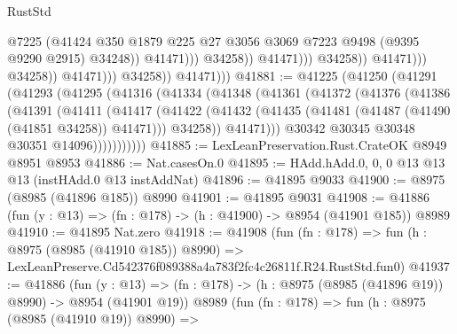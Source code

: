 \begin{lexlean}{RustStd}
\begin{coremodule}
                                                    @7225
                                                    (@41424
                                                      @350
                                                      @1879
                                                      @225
                                                      @27
                                                      @3056
                                                      @3069
                                                      @7223
                                                      @9498
                                                      (@9395 @9290 @2915)
                                                      @34248))
                                                  @41471)))
                                            @34258))
                                        @41471)))
                                  @34258))
                              @41471)))
                        @34258))
                    @41471)))
              @34258))
          @41471)))
@41881 := @41225
    (@41250
      (@41291
        (@41293
          (@41295
            (@41316
              (@41334
                (@41348
                  (@41361
                    (@41372
                      (@41376
                        (@41386
                          (@41391
                            (@41411
                              (@41417
                                (@41422
                                  (@41432
                                    (@41435 (@41481 (@41487 (@41490 (@41851 @34258)) @41471)))
                                    @34258))
                                @41471)))
                          @30342
                          @30345
                          @30348
                          @30351
                          @14096)))))))))))
@41885 := LexLeanPreservation.Rust.CrateOK @8949 @8951 @8953
@41886 := Nat.casesOn.{0}
@41895 := HAdd.hAdd.{0, 0, 0} @13 @13 @13 (instHAdd.{0} @13 instAddNat)
@41896 := @41895 @9033
@41900 := @8975 (@8985 (@41896 @185)) @8990
@41901 := @41895 @9031
@41908 := @41886 (fun (y : @13) => (fn : @178) -> (h : @41900) -> @8954 (@41901 @185)) @8989
@41910 := @41895 Nat.zero
@41918 := @41908
    (fun (fn : @178) =>
    fun (h : @8975 (@8985 (@41910 @185)) @8990) =>
    LexLeanPreserve.Cd542376f089388a4a783f2fc4c26811f.R24.RustStd.fun0)
@41937 := @41886
    (fun (y : @13) => (fn : @178) -> (h : @8975 (@8985 (@41896 @19)) @8990) -> @8954 (@41901 @19))
    @8989
    (fun (fn : @178) =>
    fun (h : @8975 (@8985 (@41910 @19)) @8990) =>

\end{coremodule}
\end{lexlean}
